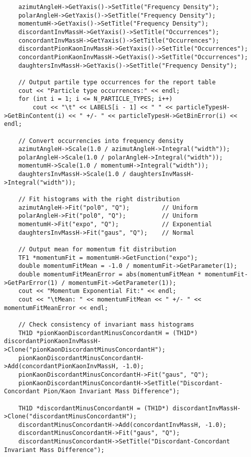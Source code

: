 \documentclass{article}
\begin{document}
\begin{verbatim}
    azimutAngleH->GetYaxis()->SetTitle("Frequency Density");
    polarAngleH->GetYaxis()->SetTitle("Frequency Density");
    momentumH->GetYaxis()->SetTitle("Frequency Density");
    discordantInvMassH->GetYaxis()->SetTitle("Occurrences");
    concordantInvMassH->GetYaxis()->SetTitle("Occurrences");
    discordantPionKaonInvMassH->GetYaxis()->SetTitle("Occurrences");
    concordantPionKaonInvMassH->GetYaxis()->SetTitle("Occurrences");
    daughtersInvMassH->GetYaxis()->SetTitle("Frequency Density");

    // Output partile type occurrences for the report table
    cout << "Particle type occurrences:" << endl;
    for (int i = 1; i <= N_PARTICLE_TYPES; i++)
        cout << "\t" << LABELS[i - 1] << " " << particleTypesH->GetBinContent(i) << " +/- " << particleTypesH->GetBinError(i) << endl;

    // Convert occurrencies into frequency density
    azimutAngleH->Scale(1.0 / azimutAngleH->Integral("width"));
    polarAngleH->Scale(1.0 / polarAngleH->Integral("width"));
    momentumH->Scale(1.0 / momentumH->Integral("width"));
    daughtersInvMassH->Scale(1.0 / daughtersInvMassH->Integral("width"));
    
    // Fit histograms with the right distribution
    azimutAngleH->Fit("pol0", "Q");         // Uniform
    polarAngleH->Fit("pol0", "Q");          // Uniform
    momentumH->Fit("expo", "Q");            // Exponential
    daughtersInvMassH->Fit("gaus", "Q");    // Normal

    // Output mean for momentum fit distribution
    TF1 *momentumFit = momentumH->GetFunction("expo");
    double momentumFitMean = -1.0 / momentumFit->GetParameter(1);
    double momentumFitMeanError = abs(momentumFitMean * momentumFit->GetParError(1) / momentumFit->GetParameter(1));
    cout << "Momentum Exponential Fit:" << endl;
    cout << "\tMean: " << momentumFitMean << " +/- " << momentumFitMeanError << endl;

    // Check consistency of invariant mass histograms
    TH1D *pionKaonDiscordantMinusConcordantH = (TH1D*) discordantPionKaonInvMassH->Clone("pionKaonDiscordantMinusConcordantH");
    pionKaonDiscordantMinusConcordantH->Add(concordantPionKaonInvMassH, -1.0);
    pionKaonDiscordantMinusConcordantH->Fit("gaus", "Q");
    pionKaonDiscordantMinusConcordantH->SetTitle("Discordant-Concordant Pion/Kaon Invariant Mass Difference");

    TH1D *discordantMinusConcordantH = (TH1D*) discordantInvMassH->Clone("discordantMinusConcordantH");
    discordantMinusConcordantH->Add(concordantInvMassH, -1.0);
    discordantMinusConcordantH->Fit("gaus", "Q");
    discordantMinusConcordantH->SetTitle("Discordant-Concordant Invariant Mass Difference");


\end{verbatim}
\end{document}
